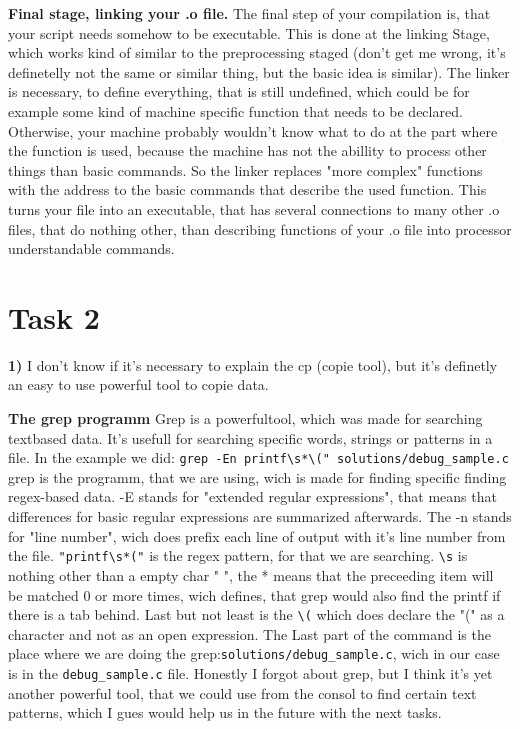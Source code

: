 \documentclass{article}
\begin{document}
\singlespacing

\textbf{Final stage, linking your .o file.}
The final step of your compilation is, that your script needs somehow to be executable. This is done at the linking Stage, which works kind of similar to the preprocessing staged (don't get me wrong, it's definetelly not the same or similar thing, but the basic idea is similar). The linker is necessary, to define everything, that is still undefined, which could be for example some kind of machine specific function that needs to be declared. Otherwise, your machine probably wouldn't know what to do at the part where the function is used, because the machine has not the abillity to process other things than basic commands. So the linker replaces "more complex" functions with the address to the  basic commands that describe the used function. This turns your file into an executable, that has several connections to many other .o files, that do nothing other, than describing functions of your .o file into processor understandable commands.

\section{Task 2}

\textbf{1)}
I don't know if it's necessary to explain the cp (copie tool), but it's definetly an easy to use powerful tool to copie data.

\singlespacing

\textbf{The grep programm}
Grep is a powerfultool, which was made for searching textbased data. It's usefull for searching specific words, strings or patterns in a file. In the example we did: \verb!grep -En printf\s*\(" solutions/debug_sample.c! grep is the programm, that we are using, wich is made for finding specific finding regex-based data. -E stands for "extended regular expressions", that means that differences for basic regular expressions are summarized afterwards. The -n stands for "line number", wich does prefix each line of output with it's line number from the file. \verb!"printf\s*("! is the regex pattern, for that we are searching. \verb!\s! is nothing other than a empty char " ", the * means that the preceeding item will be matched 0 or more times, wich defines, that grep would also find the printf if there is a tab behind. Last but not least is the \verb!\(! which does declare the "(" as a character and not as an open expression. The Last part of the command is the place where we are doing the grep:\verb!solutions/debug_sample.c!, wich in our case is in the \verb!debug_sample.c! file. Honestly I forgot about grep, but I think it's yet another powerful tool, that we could use from the consol to find certain text patterns, which I gues would help us in the future with the next tasks.
\end{document}
